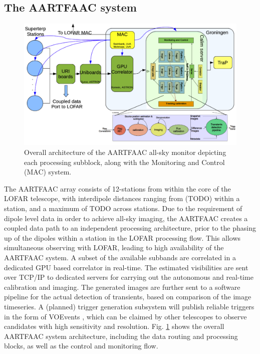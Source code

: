 \documentclass{ws-jai}
\begin{document}
\subsection {\label{subsec:aartfaac}  The AARTFAAC system}
\begin{figure}[htbp]
\centering
\includegraphics[width=1\textwidth]{Figs/overall_afaac_Arch_blks.png}
\caption {Overall  architecture of the  AARTFAAC all-sky monitor  depicting each
  processing subblock, along with the Monitoring and Control (MAC) system. }
\label{fig:afaac_arch}
\end{figure}

The AARTFAAC  array consists of  12-stations from within  the core of  the LOFAR
telescope, with interdipole distances ranging  from (TODO) within a station, and
a maximum of TODO across stations.  Due  to the requirement of dipole level data
in order to achieve all-sky imaging, the AARTFAAC creates a coupled data path to
an independent processing  architecture, prior to the phasing up  of the dipoles
within  a  station in  the  LOFAR  processing  flow.  This  allows  simultaneous
observing with  LOFAR, leading to  high availability  of the AARTFAAC  system. A
subset  of the  available  subbands  are correlated  in  a  dedicated GPU  based
correlator in  real-time.  The  estimated visibilities are  sent over  TCP/IP to
dedicated servers for carrying out  the autonomous and real-time calibration and
imaging.  The generated  images are further sent to a  software pipeline for the
actual detection of transients, based on  comparison of the image timeseries.  A
(planned) trigger  generation subsystem  will publish  reliable triggers  in the
form  of VOEvents  \cite{williams2006voevent},  which can  be  claimed by  other
telescopes    to    observe    candidates     with    high    sensitivity    and
resolution.  Fig.   \ref{fig:afaac_arch}  shows  the  overall   AARTFAAC  system
architecture, including the  data routing and processing blocks, as  well as the
control and monitoring flow.
\end{document}
